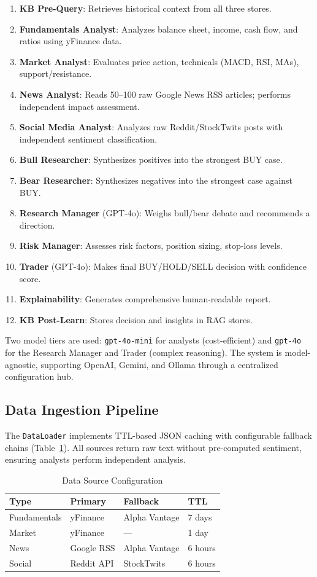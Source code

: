 \documentclass[conference]{IEEEtran}
\begin{document}
\begin{enumerate}
\item \textbf{KB Pre-Query}: Retrieves historical context from all three stores.
\item \textbf{Fundamentals Analyst}: Analyzes balance sheet, income, cash flow, and ratios using yFinance data.
\item \textbf{Market Analyst}: Evaluates price action, technicals (MACD, RSI, MAs), support/resistance.
\item \textbf{News Analyst}: Reads 50--100 raw Google News RSS articles; performs independent impact assessment.
\item \textbf{Social Media Analyst}: Analyzes raw Reddit/StockTwits posts with independent sentiment classification.
\item \textbf{Bull Researcher}: Synthesizes positives into the strongest BUY case.
\item \textbf{Bear Researcher}: Synthesizes negatives into the strongest case against BUY.
\item \textbf{Research Manager} (GPT-4o): Weighs bull/bear debate and recommends a direction.
\item \textbf{Risk Manager}: Assesses risk factors, position sizing, stop-loss levels.
\item \textbf{Trader} (GPT-4o): Makes final BUY/HOLD/SELL decision with confidence score.
\item \textbf{Explainability}: Generates comprehensive human-readable report.
\item \textbf{KB Post-Learn}: Stores decision and insights in RAG stores.
\end{enumerate}

Two model tiers are used: \texttt{gpt-4o-mini} for analysts (cost-efficient) and \texttt{gpt-4o} for the Research Manager and Trader (complex reasoning). The system is model-agnostic, supporting OpenAI, Gemini, and Ollama through a centralized configuration hub.

\subsection{Data Ingestion Pipeline}

The \texttt{DataLoader} implements TTL-based JSON caching with configurable fallback chains (Table~\ref{tab:data}). All sources return raw text without pre-computed sentiment, ensuring analysts perform independent analysis.

\begin{table}[htbp]
\caption{Data Source Configuration}
\label{tab:data}
\centering
\begin{tabular}{@{}llll@{}}
\toprule
\textbf{Type} & \textbf{Primary} & \textbf{Fallback} & \textbf{TTL} \\
\midrule
Fundamentals & yFinance & Alpha Vantage & 7 days \\
Market & yFinance & --- & 1 day \\
News & Google RSS & Alpha Vantage & 6 hours \\
Social & Reddit API & StockTwits & 6 hours \\
\bottomrule
\end{tabular}
\end{table}
\end{document}
